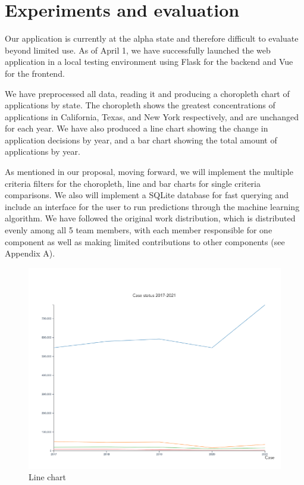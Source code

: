 \documentclass[sigconf]{acmart}
\begin{document}
\section{Experiments and evaluation}

Our application is currently at the alpha state and therefore difficult to evaluate beyond limited use. As of April 1, 
we have successfully launched the web application in a local testing environment using Flask for the backend and Vue for 
the frontend. 

We have preprocessed all data, reading it and producing a choropleth chart of applications by state. 
The choropleth shows the greatest concentrations of applications in 
California, Texas, and New York respectively, and are unchanged for each year. 
We have also produced a line chart showing the change in application decisions by year, and a bar chart showing the total 
amount of applications by year.

As mentioned in our proposal, moving forward, we will implement the multiple criteria filters for the choropleth, line and 
bar charts for single criteria comparisons. We also will implement a SQLite database for fast querying 
and include an interface for the user to run predictions through the machine learning algorithm. 
We have followed the original work distribution, which is distributed evenly among all 5 team members, 
with each member responsible for one component as 
well as making limited contributions to other components (see Appendix A). 

\begin{figure}
  \includegraphics[width=\linewidth]{fig2.png}
  \caption{Line chart}
  \label{fig:linechart}
\end{figure}
\end{document}
